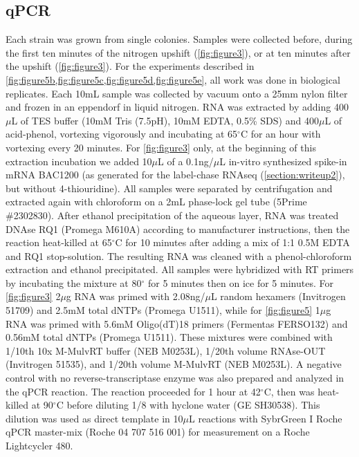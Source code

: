 {\subsection{qPCR}

Each strain was grown from single colonies.
Samples were collected before, during the first ten minutes of
the nitrogen upshift (\autoref{fig:figure3}),
or at ten minutes after the upshift (\autoref{fig:figure3}).
For the experiments described in
\autoref{fig:figure5b,fig:figure5c,fig:figure5d,fig:figure5e}, all work
was done in biological replicates.
Each 10mL sample was collected by vacuum onto a 25mm nylon filter
and frozen in an eppendorf in liquid nitrogen.
RNA was extracted by adding 400$\mu$L of TES buffer
(10mM Tris (7.5pH), 10mM EDTA, 0.5\% SDS)
and 400$\mu$L of acid-phenol, vortexing vigorously and incubating at 
65$^{\circ}$C for an hour with vortexing every 20 minutes. 
For \autoref{fig:figure3} only, at the beginning of this extraction incubation
we added 10$\mu$L of a 0.1ng/$\mu$L in-vitro synthesized spike-in 
mRNA BAC1200 (as generated
for the label-chase RNAseq (\autoref{section:writeup2}), 
but without 4-thiouridine). 
All samples were separated by centrifugation and extracted again 
with chloroform on a 2mL phase-lock gel tube (5Prime \#2302830). 
After ethanol precipitation of the aqueous layer, 
RNA was treated DNAse RQ1 (Promega M610A) according to manufacturer
instructions, then the reaction heat-killed at 65$^{\circ}$C for 
10 minutes after adding a mix of 1:1 0.5M EDTA and RQ1 stop-solution.
The resulting RNA was
cleaned with a phenol-chloroform extraction and ethanol 
precipitated.
All samples were hybridized with RT primers by incubating the mixture at 80$^{\circ}$ for 
5 minutes then on ice for 5 minutes.
For \autoref{fig:figure3} 2$\mu$g RNA was primed with 2.08ng/$\mu$L
random hexamers (Invitrogen 51709) and 
2.5mM total dNTPs (Promega U1511),
while for \autoref{fig:figure5} 1$\mu$g RNA was primed with 
5.6mM Oligo(dT)18 primers (Fermentas FERSO132) and
0.56mM total dNTPs (Promega U1511).
These mixtures were combined with 1/10th 10x M-MulvRT buffer (NEB M0253L), 
1/20th volume RNAse-OUT (Invitrogen 51535), and 1/20th volume M-MulvRT (NEB M0253L). 
A negative control with no reverse-transcriptase enzyme was also prepared
and analyzed in the qPCR reaction.
The reaction proceeded for 1 hour at 42$^{\circ}$C, 
then was heat-killed at 90$^{\circ}$C
before diluting 1/8 with hyclone water (GE SH30538). 
This dilution was used as direct
template in 10$\mu$L reactions with SybrGreen I Roche qPCR master-mix
(Roche 04 707 516 001) for measurement on a Roche Lightcycler 480. 
}
